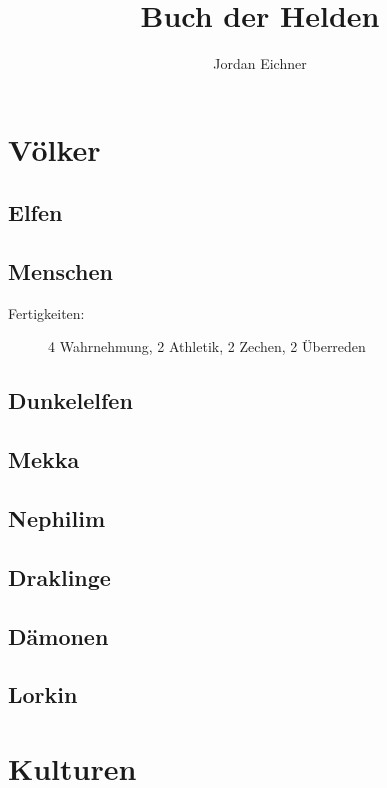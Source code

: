 \documentclass[a4paper,12pt,oneside]{book}
\title{Buch der Helden}
\author{Jordan Eichner}
\date{}
\begin{document}
\maketitle
\tableofcontents

\part{Völker}

\chapter{Elfen}

\chapter{Menschen}
\begin{description}
\item[Fertigkeiten:] 4 Wahrnehmung, 2 Athletik, 2 Zechen, 2 Überreden
\end{description}

\chapter{Dunkelelfen}

\chapter{Mekka}

\chapter{Nephilim}

\chapter{Draklinge}

\chapter{Dämonen}

\chapter{Lorkin}




\part{Kulturen}
\end{document}
